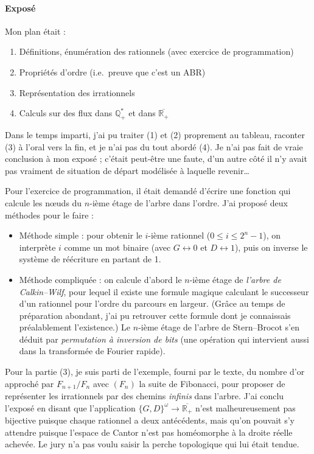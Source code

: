 \documentclass[a4paper, 11pt]{article}
\begin{document}
\paragraph{Exposé}

Mon plan était :
\begin{enumerate}
\item Définitions, énumération des rationnels (avec exercice de programmation)
\item Propriétés d'ordre (i.e.\ preuve que c'est un ABR)
\item Représentation des irrationnels
\item Calculs sur des flux dans $\mathbb{Q}_+^*$ et dans
  $\overline{\mathbb{R}_+}$
\end{enumerate}
Dans le temps imparti, j'ai pu traiter (1) et (2) proprement au tableau,
raconter (3) à l'oral vers la fin, et je n'ai pas du tout abordé (4). Je n'ai
pas fait de vraie conclusion à mon exposé ; c'était peut-être une faute, d'un
autre côté il n'y avait pas vraiment de situation de départ modélisée à laquelle
revenir…

Pour l'exercice de programmation, il était demandé d'écrire une fonction qui
calcule les nœuds du $n$-ième étage de l'arbre dans l'ordre. J'ai proposé deux
méthodes pour le faire :
\begin{itemize}
\item Méthode simple : pour obtenir le $i$-ième rationnel ($0 \leq i \leq 2^n -
  1$), on interprète $i$ comme un mot binaire (avec $G \leftrightarrow 0$ et $D
  \leftrightarrow 1$), puis on inverse le système de réécriture en partant de 1.
\item Méthode compliquée : on calcule d'abord le $n$-ième étage de \emph{l'arbre
    de Calkin--Wilf}, pour lequel il existe une formule magique calculant le
  successeur d'un rationnel pour l'ordre du parcours en largeur. (Grâce au temps
  de préparation abondant, j'ai pu retrouver cette formule dont je connaissais
  préalablement l'existence.) Le $n$-ième étage de l'arbre de Stern--Brocot s'en
  déduit par \emph{permutation à inversion de bits} (une opération qui
  intervient aussi dans la transformée de Fourier rapide).
\end{itemize}

Pour la partie (3), je suis parti de l'exemple, fourni par le texte, du nombre
d'or approché par $F_{n+1}/F_n$ avec $(F_n)$ la suite de Fibonacci, pour
proposer de représenter les irrationnels par des chemins \emph{infinis} dans
l'arbre. J'ai conclu l'exposé en disant que l'application $\{G,D\}^\omega \to
\overline{\mathbb{R}_+}$ n'est malheureusement pas bijective puisque chaque
rationnel a deux antécédents, mais qu'on pouvait s'y attendre puisque l'espace
de Cantor n'est pas homéomorphe à la droite réelle achevée. Le jury n'a pas
voulu saisir la perche topologique qui lui était tendue.
\end{document}
